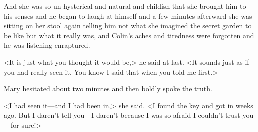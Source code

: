 And she was so un-hysterical and natural and childish that she brought him to his senses and he began to laugh at himself and a few minutes afterward she was sitting on her stool again telling him not what she imagined the secret garden to be like but what it really was, and Colin's aches and tiredness were forgotten and he was listening enraptured.

<It is just what you thought it would be,> he said at last. <It sounds just as if you had really seen it. You know I said that when you told me first.>

Mary hesitated about two minutes and then boldly spoke the truth.

<I had seen it—and I had been in,> she said. <I found the key and got in weeks ago. But I daren't tell you—I daren't because I was so afraid I couldn't trust you—for sure!>